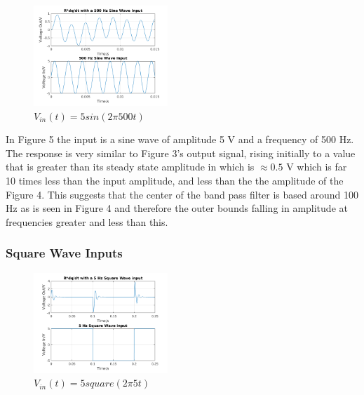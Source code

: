 \documentclass[11pt,a4paper]{article}
\begin{document}
\begin{figure}
    \vspace{-33mm}
  		\includegraphics[width=0.45\textwidth]{Ex3_Figs/500Sine.png}
	\vspace{-6mm}
  	\caption{$V_{in}(t)= 5sin(2 \pi 500t)$}
  	\label{fig:ex3g4}
\end{figure}

\vspace{2mm}In Figure 5 the input is a sine wave of amplitude 5 V and a frequency of 500 Hz. The response is very similar to Figure 3's output signal, rising initially to a value that is greater than its steady state amplitude in which is $\approx 0.5$ V which is far 10 times less than the input amplitude, and less than the the amplitude of the Figure 4. This suggests that the center of the band pass filter is based around 100 Hz as is seen in Figure 4 and therefore the outer bounds falling in amplitude at frequencies greater and less than this.

\subsubsection{Square Wave Inputs}

\begin{figure}
    \vspace{-40mm}
  		\includegraphics[width=0.45\textwidth]{Ex3_Figs/5Squ1.png}
	\vspace{-6mm}
  	\caption{$V_{in}(t)= 5square(2 \pi 5t)$}
  	\label{fig:ex3g5}
\end{figure}
\end{document}
